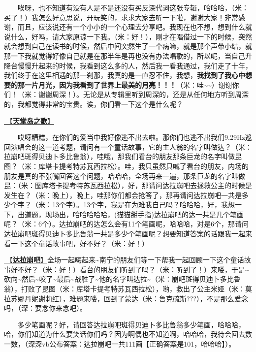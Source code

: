\documentclass[]{ctexbook}
\begin{document}
  唉呀，也不知道有没有人是不是还没有买反深代词这张专辑，哈哈哈，（米：买了！）我怎么好意思说，开玩笑的，求求大家去听一下啦，谢谢大家！非常感谢，而且，应该说还有一个小小的一个心理去分享吧。我现在也不想，想到什么就说什么，好吗，请大家原谅一下我。（米：好！），刚才在唱借过一下的时候，突然就会想到自己在读书的时候，然后中间突然生了一个病嘛，就是那个声带小结，就那一下我就觉得好像自己就是在那半年是再也没有办法唱歌的，所以呢，当自己升降台慢慢升起来的时候，我看到这么多的人，然后我一看我通过，我们走了十年，我们终于在这里相遇的那一刹那，我真的是一直忍不住，我想，\textbf{我找到了我心中想要的那一片月光，因为我看到了世界上最美的月亮！！！}（米：哇\textasciitilde\textasciitilde）谢谢你们！（米：谢谢周深！）。无论是从专辑里听到周深的，还是从任何地方听到周深的，我都觉得非常的宝贵。诶，你们看一下这个是什么呢？

\hyperref[haven-song]{🎵【\textbf{天堂岛之歌}】}

  哎呀糟糕，在你们的爱当中我好像逃不出去啦。那你们也逃不出我们9.29Hz巡回演唱会的这一道考题，请问有一个童话故事，它的主人翁的名字叫做达？（米：拉崩吧斑得贝迪卜多比鲁翁），哇哦，那我们看台的朋友那条巨龙的名字叫做昆图？（米：库塔卡提考特苏瓦西拉松）。哇，我只虽然只喊了看台的朋友，内场的朋友是真的不张嘴回答这个问题，哈哈哈，全场再来一遍，那条巨龙的名字叫做昆：（米：图库塔卡提考特苏瓦西拉松），好，那请问达拉崩吧去拯救公主的时候是发生在？（米：晚上），晚上，哇那你们都会抢答了，那再请问达拉崩吧一共是多少个字？（米：13个字）。13个字，我是在为难我自己吗？哈哈哈，好，我想一下，出道题，现场出，哈哈哈哈哈，(猫猫掰手指)达拉崩吧的达一共是几个笔画呢？（米：6个）。达拉崩吧的达怎么会有11个笔画呢，哈哈哈，对是6个，那请问达拉崩吧斑得贝迪卜多比鲁翁一共是多少个笔画呢？想要知道答案的话跟我一起来看一下这个童话故事吧，好不好？（米：好！）

\hyperref[dalabengba]{🎵【\textbf{达拉崩吧}】}全场一起嗨起来\textasciitilde 南宁的朋友们等一下帮我一起回顾一下这个童话故事好不好？（米：好！）看台的朋友们听到了吗？（米：听到了！）来喽，于是\textasciitilde 砍向\textasciitilde 然后\textasciitilde 咬了\textasciitilde 最后\textasciitilde 战胜了\textasciitilde 他的名字叫达拉\textasciitilde（米：崩吧斑得贝迪卜多比鲁翁），打败了昆图（米：库塔卡提考特苏瓦西拉松），哟，救出了公主米娅（米：莫拉苏娜丹妮谢莉红），难题来喽，回到了蒙达（米：鲁克硫斯???），不是那么爱念吗，（深：要念你来念吧）。

  多少笔画呢？好，请回答达拉崩吧斑得贝迪卜多比鲁翁多少笔画，哈哈哈，哈，你们知道为什么要笑话你们吗？因为啊偶也不知道啊，哈哈哈，我待会回去数一数，（深深vb公布答案：达拉崩吧一共111画【正确答案是101，哈哈哈】）。
\end{document}

